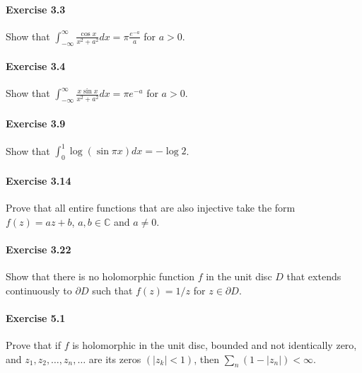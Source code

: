 \documentclass{article}
\begin{document}
\paragraph{Exercise 3.3} Show that $ \int_{-\infty}^{\infty} \frac{\cos x}{x^2 + a^2} dx = \pi \frac{e^{-a}}{a}$ for $a > 0$.


\paragraph{Exercise 3.4} Show that $ \int_{-\infty}^{\infty} \frac{x \sin x}{x^2 + a^2} dx = \pi e^{-a}$ for $a > 0$.


\paragraph{Exercise 3.9} Show that $\int_0^1 \log(\sin \pi x) dx = - \log 2$.


\paragraph{Exercise 3.14} Prove that all entire functions that are also injective take the form $f(z) = az + b$, $a, b \in \mathbb{C}$ and $a \neq 0$.


\paragraph{Exercise 3.22} Show that there is no holomorphic function $f$ in the unit disc $D$ that extends continuously to $\partial D$ such that $f(z) = 1/z$ for $z \in \partial D$.


\paragraph{Exercise 5.1} Prove that if $f$ is holomorphic in the unit disc, bounded and not identically zero, and $z_{1}, z_{2}, \ldots, z_{n}, \ldots$ are its zeros $\left(\left|z_{k}\right|<1\right)$, then $\sum_{n}\left(1-\left|z_{n}\right|\right)<\infty$.
\end{document}
